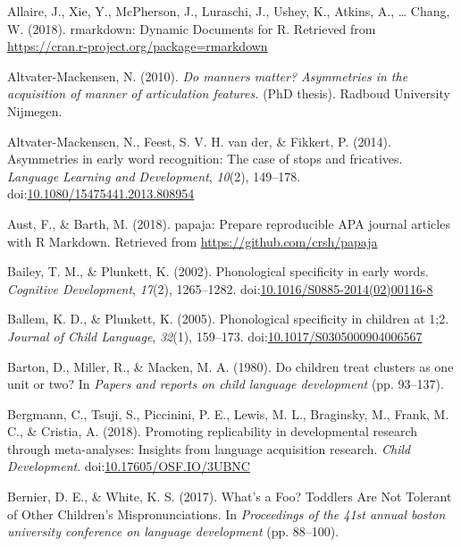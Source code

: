 \documentclass[man]{apa6}
\begin{document}
\begingroup
\setlength{\parindent}{-0.5in}
\setlength{\leftskip}{0.5in}

\hypertarget{refs}{}
\leavevmode\hypertarget{ref-RMarkdown}{}%
Allaire, J., Xie, Y., McPherson, J., Luraschi, J., Ushey, K., Atkins, A., \ldots{} Chang, W. (2018). rmarkdown: Dynamic Documents for R. Retrieved from \url{https://cran.r-project.org/package=rmarkdown}

\leavevmode\hypertarget{ref-Altvater2010}{}%
Altvater-Mackensen, N. (2010). \emph{Do manners matter? Asymmetries in the acquisition of manner of articulation features.} (PhD thesis). Radboud University Nijmegen.

\leavevmode\hypertarget{ref-Altvater2014}{}%
Altvater-Mackensen, N., Feest, S. V. H. van der, \& Fikkert, P. (2014). Asymmetries in early word recognition: The case of stops and fricatives. \emph{Language Learning and Development}, \emph{10}(2), 149--178. doi:\href{https://doi.org/10.1080/15475441.2013.808954}{10.1080/15475441.2013.808954}

\leavevmode\hypertarget{ref-papaja}{}%
Aust, F., \& Barth, M. (2018). papaja: Prepare reproducible APA journal articles with R Markdown. Retrieved from \url{https://github.com/crsh/papaja}

\leavevmode\hypertarget{ref-Bailey2002}{}%
Bailey, T. M., \& Plunkett, K. (2002). Phonological specificity in early words. \emph{Cognitive Development}, \emph{17}(2), 1265--1282. doi:\href{https://doi.org/10.1016/S0885-2014(02)00116-8}{10.1016/S0885-2014(02)00116-8}

\leavevmode\hypertarget{ref-Ballem2005}{}%
Ballem, K. D., \& Plunkett, K. (2005). Phonological specificity in children at 1;2. \emph{Journal of Child Language}, \emph{32}(1), 159--173. doi:\href{https://doi.org/10.1017/S0305000904006567}{10.1017/S0305000904006567}

\leavevmode\hypertarget{ref-Barton1980}{}%
Barton, D., Miller, R., \& Macken, M. A. (1980). Do children treat clusters as one unit or two? In \emph{Papers and reports on child language development} (pp. 93--137).

\leavevmode\hypertarget{ref-Bergmann2018}{}%
Bergmann, C., Tsuji, S., Piccinini, P. E., Lewis, M. L., Braginsky, M., Frank, M. C., \& Cristia, A. (2018). Promoting replicability in developmental research through meta-analyses: Insights from language acquisition research. \emph{Child Development}. doi:\href{https://doi.org/10.17605/OSF.IO/3UBNC}{10.17605/OSF.IO/3UBNC}

\leavevmode\hypertarget{ref-Bernier2017}{}%
Bernier, D. E., \& White, K. S. (2017). What's a Foo? Toddlers Are Not Tolerant of Other Children's Mispronunciations. In \emph{Proceedings of the 41st annual boston university conference on language development} (pp. 88--100).
\end{document}
